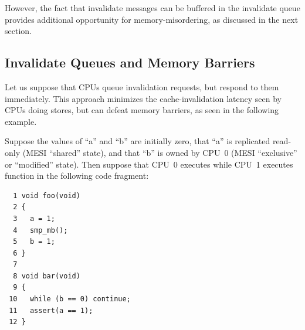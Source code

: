 However, the fact that invalidate messages can be buffered in the
invalidate queue provides additional opportunity for memory-misordering,
as discussed in the next section.

\subsection{Invalidate Queues and Memory Barriers}
\label{sec:app:whymb:Invalidate Queues and Memory Barriers}

Let us suppose that CPUs queue invalidation requests, but respond to
them immediately.
This approach minimizes the cache-invalidation latency seen by CPUs
doing stores, but can defeat memory barriers, as seen in the following
example.

Suppose the values of ``a'' and ``b'' are initially zero,
that ``a'' is replicated read-only (MESI ``shared'' state),
and that ``b''
is owned by CPU~0 (MESI ``exclusive'' or ``modified'' state).
Then suppose that CPU~0 executes  while CPU~1 executes
function  in the following code fragment:

\vspace{5pt}
\begin{minipage}[t]{\columnwidth}
\small
\begin{verbatim}
  1 void foo(void)
  2 {
  3   a = 1;
  4   smp_mb();
  5   b = 1;
  6 }
  7
  8 void bar(void)
  9 {
 10   while (b == 0) continue;
 11   assert(a == 1);
 12 }
\end{verbatim}
\end{minipage}
\vspace{5pt}

